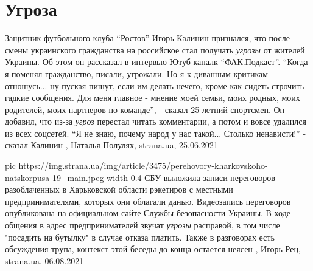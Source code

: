  
 
 
 
 
\chapter{Угроза}
\label{sec:slova.ugroza}

Защитник футбольного клуба \enquote{Ростов} Игорь Калинин признался, что после смены
украинского гражданства на российское стал получать \emph{угрозы} от жителей Украины.
Об этом он рассказал в интервью Ютуб-каналк \enquote{ФАК.Подкаст}.  \enquote{Когда я поменял
гражданство, писали, угрожали. Но я к диванным критикам отношусь... ну пуская
пишут, если им делать нечего, кроме как сидеть строчить гадкие сообщения. Для
меня главное - мнение моей семьи, моих родных, моих родителей, моих партнеров
по команде}, - сказал 25-летний спортсмен.  Он добавил, что из-за \emph{угроз}
перестал читать комментарии, а потом и вовсе удалился из всех соцсетей.  \enquote{Я не
знаю, почему народ у нас такой... Столько ненависти!} - сказал Калинин
, 
Наталья Полулях, strana.ua, 25.06.2021

\ifcmt
  pic https://img.strana.ua/img/article/3475/perehovory-kharkovskoho-natskorpusa-19_main.jpeg
  width 0.4
\fi
СБУ выложила записи переговоров разоблаченных в Харьковской области рэкетиров с
местными предпринимателями, которых они облагали данью.  Видеозапись
переговоров опубликована на официальном сайте Службы безопасности Украины.  В
ходе общения в адрес предпринимателей звучат \emph{угрозы} расправой, в том числе
"посадить на бутылку" в случае отказа платить. Также в разговорах есть
обсуждения трупа, контекст этой беседы до конца остается неясен
, 
Игорь Рец, strana.ua, 06.08.2021
